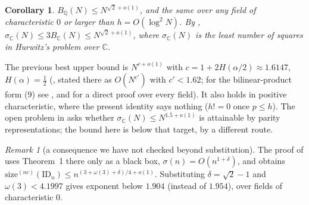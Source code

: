 \documentclass[11pt]{amsart}
\newtheorem{corollary}[theorem]{Corollary}
\theoremstyle{remark}
\newtheorem{remark}[theorem]{Remark}
\newcommand{\Q}{\mathbb{Q}}
\newcommand{\C}{\mathbb{C}}
\begin{document}
\begin{corollary}\label{cor}
$B_\Q(N)\le N^{\sqrt2+o(1)}$, and the same over any field of characteristic $0$ or larger than $h=O(\log^2N)$.
By \cite[Remark~1.5]{HWY}, $\sigma_\C(N)\le 3B_\C(N)\le N^{\sqrt2+o(1)}$, where $\sigma_\C(N)$ is the least number of
squares in Hurwitz's problem over $\C$.
\end{corollary}

The previous best upper bound is $N^{c+o(1)}$ with $c=1+2H(\alpha/2)\approx1.6147$, $H(\alpha)=\tfrac12$
(\cite[Theorem~1 and its proof in \S4]{Hru}, stated there as $O(N^{c'})$ with $c'<1.62$; for the bilinear-product form (9)
see \cite[\S5.1, Remark~18]{Hru}, and \cite[Theorem~12]{HruCCC} for a direct proof over every field). It
also holds in positive characteristic, where the present identity says nothing ($h!=0$ once $p\le h$). The open problem
in \cite[\S7]{Hru} asks whether $\sigma_\C(N)\le N^{1.5+o(1)}$ is attainable by parity representations; the bound
here is below that target, by a different route.

\begin{remark}[a consequence we have not checked beyond substitution]
The proof of \cite[Theorem~25]{Hru} uses Theorem~1 there only as a black box, $\sigma(n)=O(n^{1+\delta})$,
and obtains $\mathrm{size}^{(nc)}(\mathrm{ID}_n)\le n^{(3+\omega(3)+\delta)/4+o(1)}$. Substituting
$\delta=\sqrt2-1$ and $\omega(3)<4.1997$ gives exponent below $1.904$ (instead of $1.954$), over fields of
characteristic $0$.
\end{remark}
\end{document}
